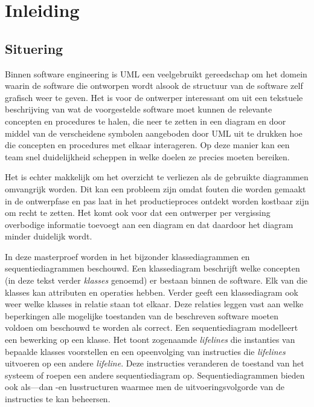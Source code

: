 \chapter{Inleiding}

\section{Situering}\label{sec:situering}

Binnen software engineering is UML een veelgebruikt gereedschap om het domein waarin de software die ontworpen wordt alsook de structuur van de software zelf grafisch weer te geven. Het is voor de ontwerper interessant om uit een tekstuele beschrijving van wat de voorgestelde software moet kunnen de relevante concepten en procedures te halen, die neer te zetten in een diagram en door middel van de verscheidene symbolen aangeboden door UML uit te drukken hoe die concepten en procedures met elkaar interageren. Op deze manier kan een team snel duidelijkheid scheppen in welke doelen ze precies moeten bereiken.

Het is echter makkelijk om het overzicht te verliezen als de gebruikte diagrammen omvangrijk worden. Dit kan een probleem zijn omdat fouten die worden gemaakt in de ontwerpfase en pas laat in het productieproces ontdekt worden kostbaar zijn om recht te zetten. Het komt ook voor dat een ontwerper per vergissing overbodige informatie toevoegt aan een diagram en dat daardoor het diagram minder duidelijk wordt.

In deze masterproef worden in het bijzonder klassediagrammen en sequentiediagrammen beschouwd.
Een klassediagram beschrijft welke concepten (in deze tekst verder \textit{klasses} genoemd) er bestaan binnen de software. Elk van die klasses kan attributen en operaties hebben. Verder geeft een klassediagram ook weer welke klasses in relatie staan tot elkaar. Deze relaties leggen vast aan welke beperkingen alle mogelijke toestanden van de beschreven software moeten voldoen om beschouwd te worden als correct.
Een sequentiediagram modelleert een bewerking op een klasse. Het toont zogenaamde \textit{lifelines} die instanties van bepaalde klasses voorstellen en een opeenvolging van instructies die \textit{lifelines} uitvoeren op een andere \textit{lifeline}. Deze instructies veranderen de toestand van het systeem of roepen een andere sequentiediagram op. Sequentiediagrammen bieden ook als---dan -en lusstructuren waarmee men de uitvoeringsvolgorde van de instructies te kan beheersen.

